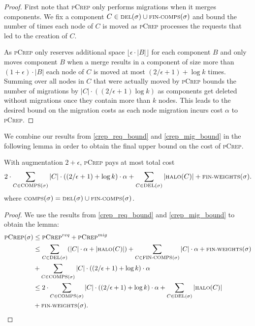 \documentclass[a4paper,UKenglish,cleveref, autoref, thm-restate,authorcolumns]{lipics-v2019}
\newcommand{\nl}{\newline}
\newcommand{\adjDel}{\textsc{pCrep}}
\newcommand{\del}{\text{\scriptsize DEL}}
\newcommand{\halo}{\text{\scriptsize HALO}}
\newcommand{\finalComps}{\text{\scriptsize FIN-COMPS}}
\newcommand{\finalWeights}{\text{\scriptsize FIN-WEIGHTS}}
\newcommand{\comps}{\text{\scriptsize COMPS}}
\begin{document}
\begin{proof}
	First note that \adjDel{} only performs migrations when it merges components.
	We fix a component $C\in\del{}(\sigma)\cup \finalComps(\sigma)$ and bound the number of times each node of $C$ is moved as \adjDel{} processes the requests that led to the creation of $C$. 
	
	As \adjDel{} only reserves additional space $\lfloor\epsilon\cdot|B|\rfloor$ for each component $B$ and only moves component $B$ when a merge results in a component of size more than $(1+\epsilon)\cdot|B|$ each node of $C$ is moved at most
	$(2/\epsilon+1)+\log k$ times. Summing over all nodes in $C$ that were actually moved by \adjDel{} bounds the number of migrations by $|C|\cdot((2/\epsilon+1) \log k)$ as components get deleted without migrations once they contain more than $k$ nodes. This leads to the desired bound on the migration costs as each node migration incurs cost $\alpha$ to \adjDel{}.
\end{proof}


We combine our results from \cref{crep_req_bound} and \cref{crep_mig_bound} in the following lemma in order to obtain the final upper bound on the cost of \adjDel{}.

\begin{lemma}
	\label{crep_upper_bound}
	With augmentation $2+\epsilon$, \adjDel{} pays at most total cost\nl
	\begin{align*}
	2\cdot\sum_{C\in\comps(\sigma)}|C|\cdot((2/\epsilon+1)+\log k)\cdot\alpha+\sum_{C\in\del{}(\sigma)}|\halo(C)|+\finalWeights(\sigma).
	\end{align*}
	where $\comps(\sigma)=\del{}(\sigma)\cup\finalComps(\sigma)$.
\end{lemma}

\begin{proof}
	We use the results from \cref{crep_req_bound} and \cref{crep_mig_bound} to obtain the lemma:
	\begin{align*}
	\adjDel(\sigma) & \leq \adjDel^{req} + \adjDel^{mig}\\
	& \leq \sum_{C\in\del{}(\sigma)}(|C|\cdot\alpha+|\halo(C)|)+\sum_{C\in \finalComps(\sigma)}|C|\cdot\alpha+\finalWeights(\sigma)\\ &+\sum_{C\in\comps(\sigma)}|C|\cdot((2/\epsilon+1)+\log k)\cdot\alpha\\
	&\leq 2\cdot\sum_{C\in\comps(\sigma)}|C|\cdot((2/\epsilon+1)+\log k)\cdot\alpha+\sum_{C\in\del{}(\sigma)}|\halo(C)|\\
	&+\finalWeights(\sigma).
	\end{align*}
\end{proof}
\end{document}
